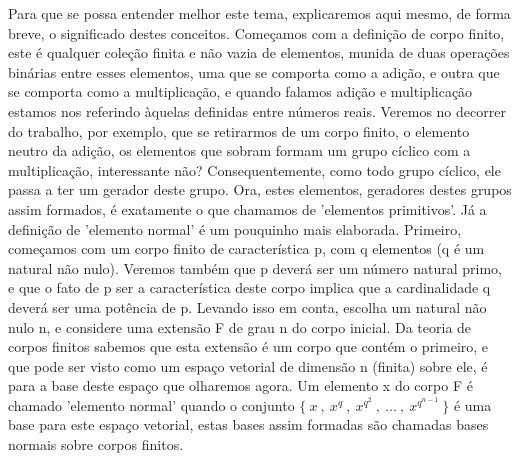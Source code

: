 \documentclass[12pt,twoside]{article}
\begin{document}
    Para que se possa entender melhor este tema, explicaremos aqui mesmo, de
    forma breve, o significado destes conceitos. Começamos com a definição de corpo
    finito, este é qualquer coleção finita e não vazia de elementos, munida de duas
    operações binárias entre esses elementos, uma que se comporta como a adição, e
    outra que se comporta como a multiplicação, e quando falamos adição e
    multiplicação estamos nos referindo àquelas definidas entre números reais. Veremos
    no decorrer do trabalho, por exemplo, que se retirarmos de um corpo finito, o
    elemento neutro da adição, os elementos que sobram formam um grupo cíclico com
    a multiplicação, interessante não? Consequentemente, como todo grupo cíclico, ele
    passa a ter um gerador deste grupo. Ora, estes elementos, geradores destes grupos
    assim formados, é exatamente o que chamamos de 'elementos primitivos'. Já a
    definição de 'elemento normal' é um pouquinho mais elaborada. Primeiro,
    começamos com um corpo finito de característica p, com q elementos (q é um
    natural não nulo). Veremos também que p deverá ser um número natural primo, e
    que o fato de p ser a característica deste corpo implica que a cardinalidade q deverá
    ser uma potência de p. Levando isso em conta, escolha um natural não nulo n, e
    considere uma extensão F de grau n do corpo inicial. Da teoria de corpos finitos
    sabemos que esta extensão é um corpo que contém o primeiro, e que pode ser visto
    como um espaço vetorial de dimensão n (finita) sobre ele, é para a base deste
    espaço que olharemos agora. Um elemento x do corpo F é chamado 'elemento normal' quando o conjunto $\{ \ x \ , \ x^{q} \ , \ x^{q^{2}} \ , \ ... \ , \ x^{q^{n-1}} \ \}$ é uma base para este espaço
    vetorial, estas bases assim formadas são chamadas bases normais sobre corpos
    finitos. \\
    
  
\end{document}

